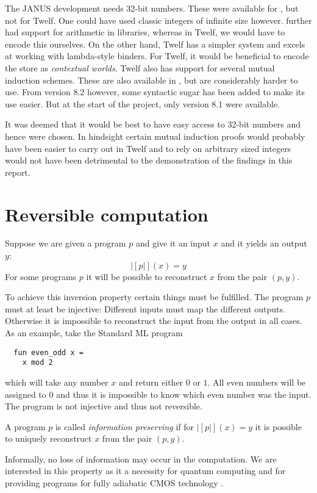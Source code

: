 
The JANUS development needs 32-bit numbers. These were available
for \coq{}, but not for Twelf. One could have used classic integers of
infinite size however. \coq{} further had support for arithmetic in
libraries, whereas in Twelf, we would have to encode this
ourselves. On the other hand, Twelf has a simpler system and excels at
working with lambda-style binders. For Twelf, it would be beneficial
to encode the store as \emph{contextual worlds}. Twelf also has
support for several mutual induction schemes. These are also available
in \coq{}, but are considerably harder to use. From \coq{} version 8.2
however, some syntactic sugar has been added to make its use
easier. But at the start of the project, only \coq{} version 8.1 were
available.


It was deemed that it would be best to have easy access to 32-bit
numbers and hence \coq{} were chosen. In hindsight certain mutual
induction proofs would probably have been easier to carry out in Twelf
and to rely on arbitrary sized integers would not have been
detrimental to the demonstration of the findings in this report.

\section{Reversible computation}
\label{sec:revers-comp}

Suppose we are given a program $p$ and give it an input $x$ and it
yields an output $y$:
\begin{equation*}
  |[p|](x) = y
\end{equation*}
For some programs $p$ it will be possible to reconstruct $x$ from the
pair $(p, y)$.

To achieve this inversion property certain things must be
fulfilled. The program $p$ must at least be injective: Different
inputs must map the different outputs. Otherwise it is impossible to
reconstruct the input from the output in all cases. As an example,
take the Standard ML program
\begin{verbatim}
  fun even_odd x =
    x mod 2
\end{verbatim}
which will take any number $x$ and return either $0$ or $1$. All even
numbers will be assigned to $0$ and thus it is impossible to know
which even number was the input. The program is not injective and thus
not reversible.

\begin{defn}
  A program $p$ is called \emph{information preserving} if for
  $|[p|](x) = y$ it is possible to uniquely reconstruct $x$ from the
  pair $(p, y)$.
\end{defn}
Informally, no loss of information may occur in the computation. We
are interested in this property as it a necessity for quantum
computing  and for providing programs for fully
adiabatic CMOS technology .

